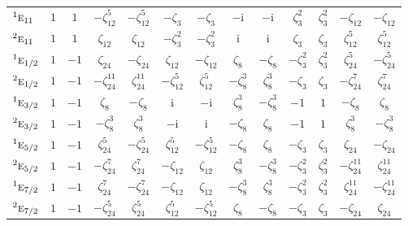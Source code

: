 \documentclass[10pt,a4paper]{article}
\makeatletter
\def\grouprule#1#2{\noalign{\marks\LTgroupmarks{\the\belowrulesep}\nobreak\vskip#1%
  \vskip\aboverulesep}\multispan\LT@cols\unskip{\leaders\hrule\@height#2\hfill\kern\z@}\cr
  \noalign{\penalty\LTrulebreak\vskip\belowrulesep\global\@lastruleclass\z@}}
\numberwithin{equation}{section}
\newcommand{\irr}[1]{\text{\normalfont\scshape #1}}
\newcommand{\conjpair}[1]{{}^{#1}}
\newcommand{\iunit}{\mathrm{i}}
\newcommand{\rootunity}[1]{\zeta_{#1}}
\makeatother
\begin{document}
{\begin{longtable}{@{}lcccccccccccc@{}}
$\conjpair{1}\irr{e}_{11}$ & $1$ & $1$ & $-\rootunity{12}^{5}$ & $-\rootunity{12}^{5}$ & $-\rootunity{3}$ & $-\rootunity{3}$ & $-\iunit{}$ & $-\iunit{}$ & $\rootunity{3}^{2}$ & $\rootunity{3}^{2}$ & $-\rootunity{12}$ & $-\rootunity{12}$\\
$\conjpair{2}\irr{e}_{11}$ & $1$ & $1$ & $\rootunity{12}$ & $\rootunity{12}$ & $-\rootunity{3}^{2}$ & $-\rootunity{3}^{2}$ & $\iunit{}$ & $\iunit{}$ & $\rootunity{3}$ & $\rootunity{3}$ & $\rootunity{12}^{5}$ & $\rootunity{12}^{5}$\\
\grouprule{0pt}{\lightrulewidth}
$\conjpair{1}\irr{e}_{1/2}$ & $1$ & $-1$ & $\rootunity{24}$ & $-\rootunity{24}$ & $\rootunity{12}$ & $-\rootunity{12}$ & $\rootunity{8}$ & $-\rootunity{8}$ & $-\rootunity{3}^{2}$ & $\rootunity{3}^{2}$ & $\rootunity{24}^{5}$ & $-\rootunity{24}^{5}$\\
$\conjpair{2}\irr{e}_{1/2}$ & $1$ & $-1$ & $-\rootunity{24}^{11}$ & $\rootunity{24}^{11}$ & $-\rootunity{12}^{5}$ & $\rootunity{12}^{5}$ & $-\rootunity{8}^{3}$ & $\rootunity{8}^{3}$ & $-\rootunity{3}$ & $\rootunity{3}$ & $-\rootunity{24}^{7}$ & $\rootunity{24}^{7}$\\
$\conjpair{1}\irr{e}_{3/2}$ & $1$ & $-1$ & $\rootunity{8}$ & $-\rootunity{8}$ & $\iunit{}$ & $-\iunit{}$ & $\rootunity{8}^{3}$ & $-\rootunity{8}^{3}$ & $-1$ & $1$ & $-\rootunity{8}$ & $\rootunity{8}$\\
$\conjpair{2}\irr{e}_{3/2}$ & $1$ & $-1$ & $-\rootunity{8}^{3}$ & $\rootunity{8}^{3}$ & $-\iunit{}$ & $\iunit{}$ & $-\rootunity{8}$ & $\rootunity{8}$ & $-1$ & $1$ & $\rootunity{8}^{3}$ & $-\rootunity{8}^{3}$\\
$\conjpair{1}\irr{e}_{5/2}$ & $1$ & $-1$ & $\rootunity{24}^{5}$ & $-\rootunity{24}^{5}$ & $\rootunity{12}^{5}$ & $-\rootunity{12}^{5}$ & $-\rootunity{8}$ & $\rootunity{8}$ & $-\rootunity{3}$ & $\rootunity{3}$ & $\rootunity{24}$ & $-\rootunity{24}$\\
$\conjpair{2}\irr{e}_{5/2}$ & $1$ & $-1$ & $-\rootunity{24}^{7}$ & $\rootunity{24}^{7}$ & $-\rootunity{12}$ & $\rootunity{12}$ & $\rootunity{8}^{3}$ & $-\rootunity{8}^{3}$ & $-\rootunity{3}^{2}$ & $\rootunity{3}^{2}$ & $-\rootunity{24}^{11}$ & $\rootunity{24}^{11}$\\
$\conjpair{1}\irr{e}_{7/2}$ & $1$ & $-1$ & $\rootunity{24}^{7}$ & $-\rootunity{24}^{7}$ & $-\rootunity{12}$ & $\rootunity{12}$ & $-\rootunity{8}^{3}$ & $\rootunity{8}^{3}$ & $-\rootunity{3}^{2}$ & $\rootunity{3}^{2}$ & $\rootunity{24}^{11}$ & $-\rootunity{24}^{11}$\\
$\conjpair{2}\irr{e}_{7/2}$ & $1$ & $-1$ & $-\rootunity{24}^{5}$ & $\rootunity{24}^{5}$ & $\rootunity{12}^{5}$ & $-\rootunity{12}^{5}$ & $\rootunity{8}$ & $-\rootunity{8}$ & $-\rootunity{3}$ & $\rootunity{3}$ & $-\rootunity{24}$ & $\rootunity{24}$\\

\end{longtable}}
\end{document}
